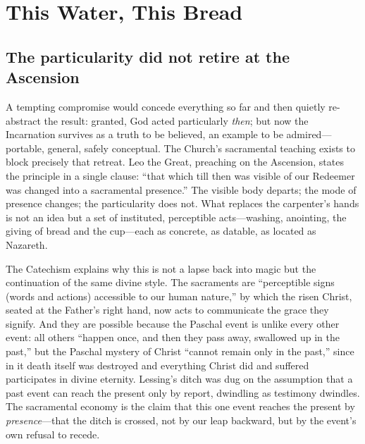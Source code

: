 \section{This Water, This Bread}

\subsection{The particularity did not retire at the Ascension}

A tempting compromise would concede everything so far and then quietly re-abstract the result: granted, God acted particularly \emph{then}; but now the Incarnation survives as a truth to be believed, an example to be admired---portable, general, safely conceptual. The Church's sacramental teaching exists to block precisely that retreat. Leo the Great, preaching on the Ascension, states the principle in a single clause: ``that which till then was visible of our Redeemer was changed into a sacramental presence.'' The visible body departs; the mode of presence changes; the particularity does not. What replaces the carpenter's hands is not an idea but a set of instituted, perceptible acts---washing, anointing, the giving of bread and the cup---each as concrete, as datable, as located as Nazareth.

The Catechism explains why this is not a lapse back into magic but the continuation of the same divine style. The sacraments are ``perceptible signs (words and actions) accessible to our human nature,'' by which the risen Christ, seated at the Father's right hand, now acts to communicate the grace they signify. And they are possible because the Paschal event is unlike every other event: all others ``happen once, and then they pass away, swallowed up in the past,'' but the Paschal mystery of Christ ``cannot remain only in the past,'' since in it death itself was destroyed and everything Christ did and suffered participates in divine eternity. Lessing's ditch was dug on the assumption that a past event can reach the present only by report, dwindling as testimony dwindles. The sacramental economy is the claim that this one event reaches the present by \emph{presence}---that the ditch is crossed, not by our leap backward, but by the event's own refusal to recede.

